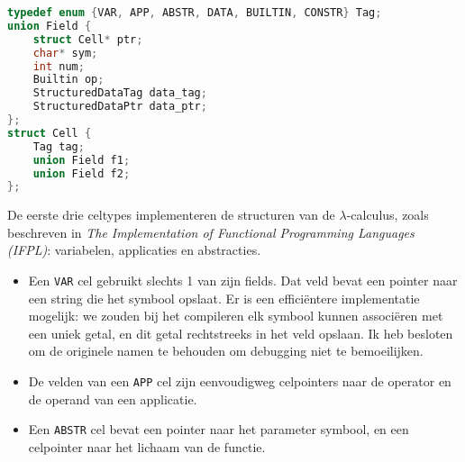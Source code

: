 \documentclass[a4paper,10pt]{article}
\begin{document}
\begin{lstlisting}[language=C,frame=single,caption={Definitie van de Cell datastructuur}]
typedef enum {VAR, APP, ABSTR, DATA, BUILTIN, CONSTR} Tag;
union Field {
	struct Cell* ptr;
	char* sym;
	int num;
	Builtin op;
	StructuredDataTag data_tag;
	StructuredDataPtr data_ptr;
};
struct Cell {
	Tag tag;
	union Field f1;
	union Field f2;
};
\end{lstlisting}

De eerste drie celtypes implementeren de structuren van de $\lambda$-calculus, zoals beschreven in \emph{The Implementation of Functional Programming Languages (IFPL)}: variabelen, applicaties en abstracties.
\begin{itemize}
\item
  Een \texttt{VAR} cel gebruikt slechts 1 van zijn fields.
  Dat veld bevat een pointer naar een string die het symbool opslaat.
  Er is een effici{\"e}ntere implementatie mogelijk: we zouden bij het compileren elk symbool kunnen associ{\"e}ren met een uniek getal, en dit getal rechtstreeks in het veld opslaan.
  Ik heb besloten om de originele namen te behouden om debugging niet te bemoeilijken.
\item
  De velden van een \texttt{APP} cel zijn eenvoudigweg celpointers naar de operator en de operand van een applicatie.
\item
  Een \texttt{ABSTR} cel bevat een pointer naar het parameter symbool, en een celpointer naar het lichaam van de functie.
\end{itemize}
\end{document}
